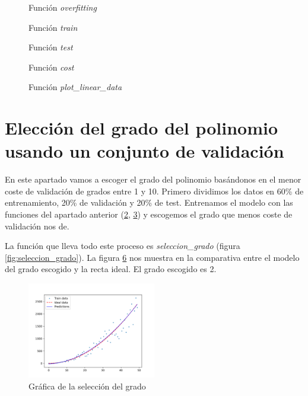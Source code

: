 \documentclass[6pt]{../../shared/AiTex}
\begin{document}
\begin{figure}[H]
    \centering
    
    \caption{Función \textit{overfitting}}
    \label{fig:overfitting}
\end{figure}

\begin{figure}[H]
    \centering
    
    \caption{Función \textit{train}}
    \label{fig:train}
\end{figure}

\begin{figure}[H]
    \centering
    
    \caption{Función \textit{test}}
    \label{fig:test}
\end{figure}

\begin{figure}[H]
    \centering
    
    \caption{Función \textit{cost}}
    \label{fig:cost}
\end{figure}

\begin{figure}[H]
    \centering
    
    \caption{Función \textit{plot\_linear\_data}}
    \label{fig:plot_linear_data}
\end{figure}

\section{Elección del grado del polinomio usando un conjunto de validación}

En este apartado vamos a escoger el grado del polinomio basándonos en el menor coste de validación de grados entre 1 y 10. Primero dividimos los datos en 60\% de entrenamiento, 20\% de validación y 20\% de test. Entrenamos el modelo con las funciones del apartado anterior (\ref{fig:train}, \ref{fig:test}) y escogemos el grado que menos coste de validación nos de.

La función que lleva todo este proceso es \textit{seleccion\_grado} (figura \ref{fig:seleccion_grado}). La figura \ref{fig:seleccion_grado_plot} nos muestra en la comparativa entre el modelo del grado escogido y la recta ideal. El grado escogido es 2.

\begin{figure}[H]
    \centering
    \includegraphics[width=0.5\textwidth]{./images/grado.png}
    \caption{Gráfica de la selección del grado}
    \label{fig:seleccion_grado_plot}
\end{figure}
\end{document}
